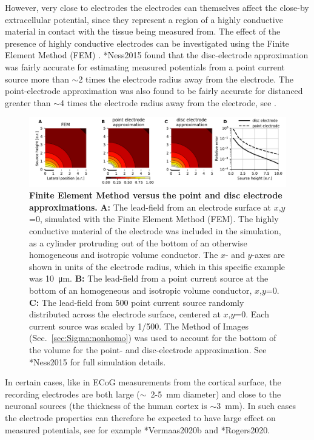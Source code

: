 However, very close to electrodes the electrodes can themselves affect the close-by extracellular potential, since they represent a region of a highly conductive material in contact with the tissue being measured from.
The effect of the presence of highly conductive electrodes can be investigated using the Finite Element Method (FEM) . \citeasnoun**{Ness2015} found that the disc-electrode approximation was fairly accurate for estimating measured potentials from a point current source more than $\sim$2 times the electrode radius away from the electrode. The point-electrode approximation was also found to be fairly accurate for distanced greater than $\sim$4 times the electrode radius away from the electrode, see .

\begin{figure}[!ht]
\begin{center}
\includegraphics[width=1\textwidth]{Figures/VC/fig_FEM_elec.pdf}
\end{center}
\caption[]{\textbf{Finite Element Method versus the point and disc electrode approximations.}
{\bf A:} The lead-field from an electrode surface at $x$,$y$=0, simulated with the Finite Element Method (FEM). The highly conductive material of the electrode was included in the simulation, as a cylinder protruding out of the bottom of an otherwise homogeneous and isotropic volume conductor. The $x$- and $y$-axes are shown in units of the electrode radius, which in this specific example was 10~\si{\micro\metre}.
{\bf B:} The lead-field from a point current source at the bottom of an homogeneous and isotropic volume conductor, $x$,$y$=0.
{\bf C:} The lead-field from 500 point current source randomly distributed across the electrode surface, centered at $x$,$y$=0. Each current source was scaled by 1/500.
The Method of Images (Sec.~\ref{sec:Sigma:nonhomo}) was used to account for the bottom of the volume for the point- and disc-electrode approximation.
See \citeasnoun**{Ness2015} for full simulation details.
}
\label{fig:VC:FEM_elec}
\end{figure}

In certain cases, like in ECoG  measurements from the cortical surface, the recording electrodes are both large ($\sim$~2-5~mm diameter) and close to the neuronal sources (the thickness of the human cortex is $\sim$3~mm). In such cases the electrode properties can therefore be expected to have large effect on measured potentials, see for example \citeasnoun**{Vermaas2020b} and \citeasnoun**{Rogers2020}.

